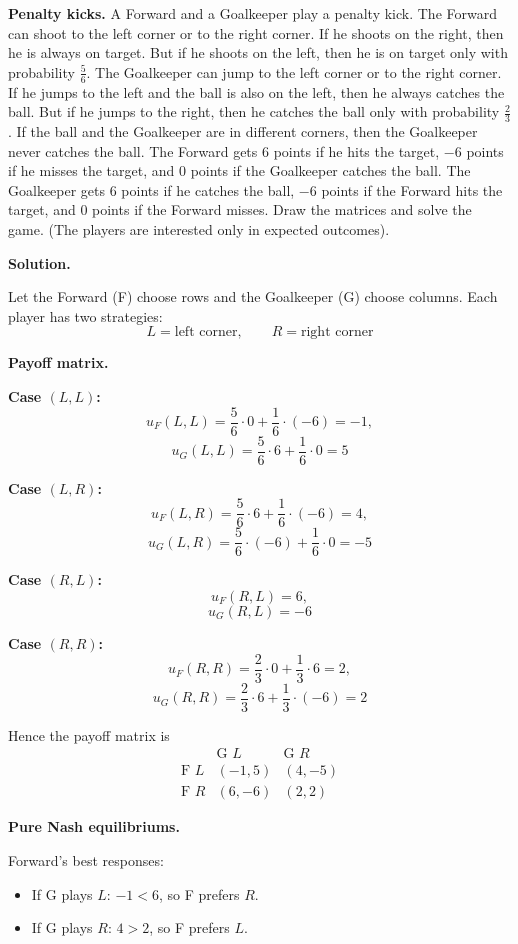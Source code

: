 \textbf{Penalty kicks.}
A Forward and a Goalkeeper play a penalty kick.
The Forward can shoot to the left corner or to the right corner.
If he shoots on the right, then he is always on target.
But if he shoots on the left, then he is on target only with probability \(\frac{5}{6}\).
The Goalkeeper can jump to the left corner or to the right corner.
If he jumps to the left and the ball is also on the left, then he always catches the ball.
But if he jumps to the right, then he catches the ball only with probability \(\frac{2}{3}\).
If the ball and the Goalkeeper are in different corners, then the Goalkeeper never catches the ball.
The Forward gets \(6\) points if he hits the target, \(-6\) points if he misses the target, and \(0\) points if the Goalkeeper catches the ball.
The Goalkeeper gets \(6\) points if he catches the ball, \(-6\) points if the Forward hits the target, and \(0\) points if the Forward misses.
Draw the matrices and solve the game.
(The players are interested only in expected outcomes).

\textbf{Solution.}

Let the Forward (F) choose rows and the Goalkeeper (G) choose columns. Each player has two strategies:
\[
L=\text{left corner}, \qquad R=\text{right corner}
\]

\textbf{Payoff matrix.}

\textbf{Case $(L,L)$:}
\[
u_F(L,L)=\frac{5}{6}\cdot 0 + \frac{1}{6}\cdot(-6)=-1,
\]
\[
u_G(L,L)=\frac{5}{6}\cdot 6 + \frac{1}{6}\cdot 0=5
\]

\textbf{Case $(L,R)$:}
\[
u_F(L,R)=\frac{5}{6}\cdot 6 + \frac{1}{6}\cdot(-6)=4,
\]
\[
u_G(L,R)=\frac{5}{6}\cdot(-6) + \frac{1}{6}\cdot 0=-5
\]

\textbf{Case $(R,L)$:}
\[
u_F(R,L)=6,
\]
\[
u_G(R,L)=-6
\]

\textbf{Case $(R,R)$:}
\[
u_F(R,R)=\frac{2}{3}\cdot 0 + \frac{1}{3}\cdot 6=2,
\]
\[
u_G(R,R)=\frac{2}{3}\cdot 6 + \frac{1}{3}\cdot(-6)=2
\]

Hence the payoff matrix is
\[
\begin{array}{c|cc}
 & \text{G }L & \text{G }R\\
\hline
\text{F }L & (-1,5) & (4,-5)\\
\text{F }R & (6,-6) & (2,2)
\end{array}
\]

\textbf{Pure Nash equilibriums.}

Forward's best responses:
\begin{itemize}
\item If G plays $L$: $-1 < 6$, so F prefers $R$.
\item If G plays $R$: $4 > 2$, so F prefers $L$.
\end{itemize}

